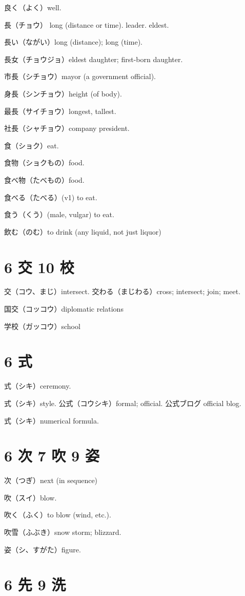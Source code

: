 良く（よく）well.

長（チョウ）
long (distance or time).
leader.
eldest.

長い（ながい）long (distance); long (time).

長女（チョウジョ）eldest daughter; first-born daughter.

市長（シチョウ）mayor (a government official).

身長（シンチョウ）height (of body).

最長（サイチョウ）longest, tallest.

社長（シャチョウ）company president.

食（ショク）eat.

食物（ショクもの）food.

食べ物（たべもの）food.

食べる（たべる）(v1) to eat.

食う（くう）(male, vulgar) to eat.

飲む（のむ）to drink (any liquid, not just liquor)

\section{6 交 10 校}

交（コウ、まじ）intersect.
交わる（まじわる）cross; intersect; join; meet.

国交（コッコウ）diplomatic relations

学校（ガッコウ）school

\section{6 式}

式（シキ）ceremony.

式（シキ）style.
公式（コウシキ）formal; official.
公式ブログ official blog.

式（シキ）numerical formula.

\section{6 次 7 吹 9 姿}

次（つぎ）next (in sequence)

吹（スイ）blow.

吹く（ふく）to blow (wind, etc.).

吹雪（ふぶき）snow storm; blizzard.

姿（シ、すがた）figure.

\section{6 先 9 洗}

